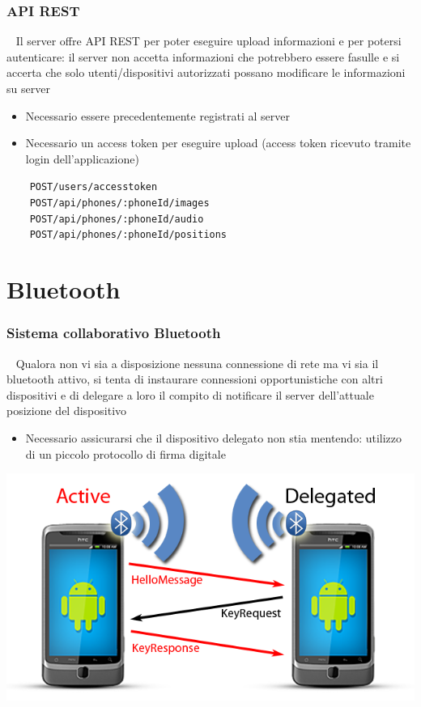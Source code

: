 \documentclass{beamer}
\begin{document}
\begin{frame}
\frametitle{API REST}
\begin{block}{~}
Il server offre API REST per poter eseguire upload informazioni e per potersi autenticare: il server non accetta informazioni che potrebbero essere fasulle e si accerta che solo utenti/dispositivi autorizzati possano modificare le informazioni su server
\end{block}
\begin{itemize}
  \item Necessario essere precedentemente registrati al server
  \item Necessario un access token per eseguire upload (access token ricevuto tramite login dell'applicazione)
\end{itemize}
\texttt{~~~~\lbrack POST\rbrack  /users/accesstoken\\
~~~~\lbrack POST\rbrack	/api/phones/:phoneId/images\\
~~~~\lbrack POST\rbrack 	/api/phones/:phoneId/audio\\
~~~~\lbrack POST\rbrack  /api/phones/:phoneId/positions}


\end{frame}


\section{Bluetooth}
\begin{frame}
\frametitle{Sistema collaborativo Bluetooth}
\begin{block}{~}
Qualora non vi sia a disposizione nessuna connessione di rete ma vi sia il bluetooth attivo, si tenta di instaurare connessioni opportunistiche con altri dispositivi e di delegare a loro il compito di notificare il server dell'attuale posizione del dispositivo
\end{block}
\begin{itemize}
  \item Necessario assicurarsi che il dispositivo delegato non stia mentendo: utilizzo di un piccolo protocollo di firma digitale
\end{itemize}
\begin{center}
\includegraphics[scale=.2]{./img/bluetooth.png}
\end{center}
\end{frame}
\end{document}
